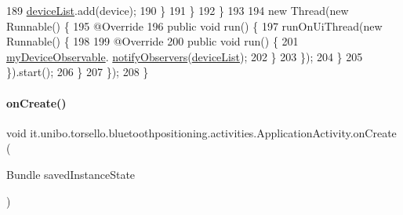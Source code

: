 \begin{DoxyCode}
189                             \hyperlink{classit_1_1unibo_1_1torsello_1_1bluetoothpositioning_1_1activities_1_1ApplicationActivity_ad146f35cfee210f7191442658a235a2f_ad146f35cfee210f7191442658a235a2f}{deviceList}.add(device);
190                         \}
191                     \}
192                 \}
193 
194                 \textcolor{keyword}{new} Thread(\textcolor{keyword}{new} Runnable() \{
195                     @Override
196                     \textcolor{keyword}{public} \textcolor{keywordtype}{void} run() \{
197                         runOnUiThread(\textcolor{keyword}{new} Runnable() \{
198 
199                             @Override
200                             \textcolor{keyword}{public} \textcolor{keywordtype}{void} run() \{
201                                 \hyperlink{classit_1_1unibo_1_1torsello_1_1bluetoothpositioning_1_1activities_1_1ApplicationActivity_aa6481e11e062d3539e6848f0790852b8_aa6481e11e062d3539e6848f0790852b8}{myDeviceObservable}.
      \hyperlink{classit_1_1unibo_1_1torsello_1_1bluetoothpositioning_1_1observables_1_1DeviceObservable_aaf183e537e44cbd114c8eb76432da191_aaf183e537e44cbd114c8eb76432da191}{notifyObservers}(\hyperlink{classit_1_1unibo_1_1torsello_1_1bluetoothpositioning_1_1activities_1_1ApplicationActivity_ad146f35cfee210f7191442658a235a2f_ad146f35cfee210f7191442658a235a2f}{deviceList});
202                             \}
203                         \});
204                     \}
205                 \}).start();
206             \}
207         \});
208     \}
\end{DoxyCode}
\hypertarget{classit_1_1unibo_1_1torsello_1_1bluetoothpositioning_1_1activities_1_1ApplicationActivity_a395bfa7ec016998b254b9e197ef8d754_a395bfa7ec016998b254b9e197ef8d754}{}\label{classit_1_1unibo_1_1torsello_1_1bluetoothpositioning_1_1activities_1_1ApplicationActivity_a395bfa7ec016998b254b9e197ef8d754_a395bfa7ec016998b254b9e197ef8d754} 
\paragraph{\texorpdfstring{on\+Create()}{onCreate()}}
{\footnotesize\ttfamily void it.\+unibo.\+torsello.\+bluetoothpositioning.\+activities.\+Application\+Activity.\+on\+Create (\begin{DoxyParamCaption}\item[{Bundle}]{saved\+Instance\+State }\end{DoxyParamCaption})}


